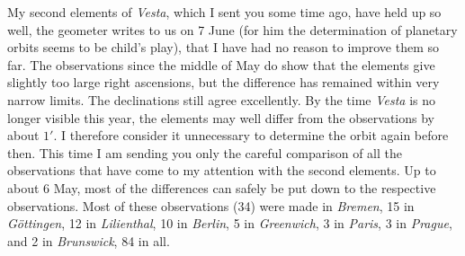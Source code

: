 \par\indent My second elements of \emph{Vesta}, which I sent you some time ago, have held up so well, the geometer writes to us on 7 June (for him the determination of planetary orbits seems to be child’s play), that I have had no reason to improve them so far. The observations since the middle of May do show that the elements give slightly too large right ascensions, but the difference has remained within very narrow limits. The declinations still agree excellently. By the time \emph{Vesta} is no longer visible this year, the elements may well differ from the observations by about $1'$. I therefore consider it unnecessary to determine the orbit again before then. This time I am sending you only the careful comparison of all the observations that have come to my attention with the second elements. Up to about 6 May, most of the differences can safely be put down to the respective observations. Most of these observations (34) were made in \emph{Bremen}, 15 in \emph{Göttingen}, 12 in \emph{Lilienthal}, 10 in \emph{Berlin}, 5 in \emph{Greenwich}, 3 in \emph{Paris}, 3 in \emph{Prague}, and 2 in \emph{Brunswick}, 84 in all.
\clearpage
\begingroup
\fontsize{9}{11}\selectfont
\setlength{\tabcolsep}{2.5pt}\renewcommand{\arraystretch}{1.10}

